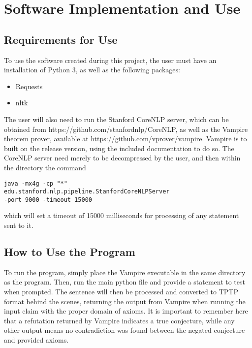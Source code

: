 \chapter{Software Implementation and Use}

\section{Requirements for Use}

To use the software created during this project, the user must have an installation of Python 3, as well as the following packages:
\begin{itemize}
\item Requests
\item nltk
\end{itemize}

The user will also need to run the Stanford CoreNLP server, which can be obtained from https://github.com/stanfordnlp/CoreNLP, as well as the Vampire theorem prover, available at https://github.com/vprover/vampire. Vampire is to built on the release version, using the included documentation to do so. The CoreNLP server need merely to be decompressed by the user, and then within the directory the command

\begin{verbatim}
java -mx4g -cp "*"
edu.stanford.nlp.pipeline.StanfordCoreNLPServer
-port 9000 -timeout 15000
\end{verbatim}

which will set a timeout of 15000 milliseconds for processing of any statement sent to it.

\section{How to Use the Program}

To run the program, simply place the Vampire executable in the same directory as the program. Then, run the main python file and provide a statement to test when prompted. The sentence will then be processed and converted to TPTP format behind the scenes, returning the output from Vampire when running the input claim with the proper domain of axioms. It is important to remember here that a refutation returned by Vampire indicates a true conjecture, while any other output means no contradiction was found between the negated conjecture and provided axioms.
